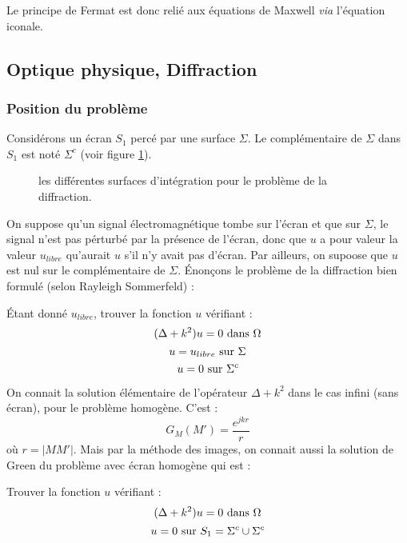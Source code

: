 \documentclass[12pt]{book}
\begin{document}
Le principe de Fermat est donc reli\'e aux \'equations de Maxwell {\it via}
l'\'equation iconale.

\subsection{Optique physique, Diffraction}\label{secdiffra}
\subsubsection{Position du probl\`eme}

Consid\'erons un \'ecran $S_1$ perc\'e par une
surface 
$\Sigma$. Le compl\'ementaire de $\Sigma$ dans $S_1$ est not\'e
$\Sigma^c$ (voir figure \ref{figecran}).
\begin{figure}[htb]
 \centerline{}   
 \caption{les diff\'erentes surfaces d'int\'egration pour le probl\`eme de la diffraction.}
 \label{figecran}
\end{figure}
On suppose qu'un signal \'electromagn\'etique tombe sur l'\'ecran et
que sur $\Sigma$, le signal n'est pas p\'erturb\'e par la pr\'esence
de l'\'ecran, donc que $u$ a pour valeur la valeur $u_{libre}$
qu'aurait $u$ s'il n'y avait pas d'\'ecran. Par ailleurs, on supoose
que $u$ est nul sur le compl\'ementaire de $\Sigma$.
\'Enon\c cons le probl\`eme de la diffraction bien
formul\'e\cite{ph:optic:Goodman68} (selon Rayleigh Sommerfeld) : 
\begin{prob}
\'Etant donn\'e $u_{libre}$, trouver la fonction $u$ v\'erifiant :
\begin{equation}
 (\Delta +k^2)u=0{\rm\ dans\ }\Omega
\end{equation}
\begin{equation}
u=u_{libre} {\rm\ sur\ }\Sigma
\end{equation}
\begin{equation}
u=0{\rm\ sur\ }\Sigma^c
\end{equation}
\end{prob}
On connait la solution \'el\'ementaire de l'op\'erateur $\Delta +k^2$
dans le cas infini (sans \'ecran), pour le probl\`eme homog\`ene. C'est
:
\begin{equation}
G_M(M')=\frac{e^{jkr}}{r}
\end{equation}
o\`u $r=|MM'|$.
Mais
par la m\'ethode des images, on connait aussi la solution de Green du
probl\`eme avec \'ecran homog\`ene qui est :
\begin{prob}
Trouver la fonction $u$ v\'erifiant :
\begin{equation}
 (\Delta +k^2)u=0{\rm\ dans\ }\Omega
\end{equation}
\begin{equation}
u=0{\rm\ sur\ }S_1=\Sigma^c\cup\Sigma^c
\end{equation}
\end{prob}
\end{document}
